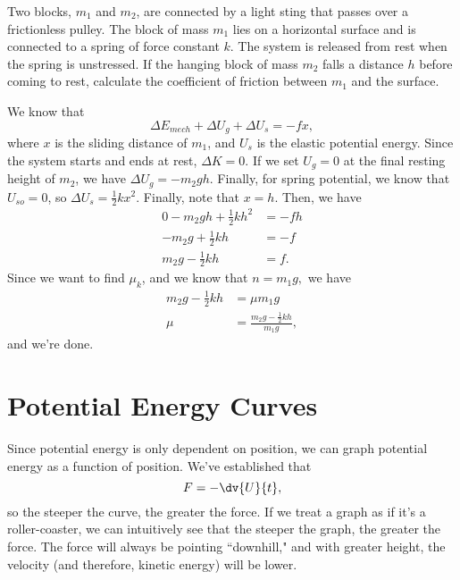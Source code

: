\documentclass[11pt]{article}
\begin{document}
\begin{example}
	Two blocks, $m_1$ and $m_2$, are connected by a light sting that passes over a frictionless pulley. The block of mass $m_1$ lies on a horizontal surface and is connected to a spring of force constant $k$. The system is released from rest when the spring is unstressed. If the hanging block of mass $m_2$ falls a distance $h$ before coming to rest, calculate the coefficient of friction between $m_1$ and the surface.
\end{example}
\begin{solution}
	We know that
	\[\Delta E_{mech} + \Delta U_g + \Delta U_s = -fx,\]
	where $x$ is the sliding distance of $m_1$, and $U_s$ is the elastic potential energy. Since the system starts and ends at rest, $\Delta K = 0$. If we set $U_g = 0$ at the final resting height of $m_2$, we have $\Delta U_g = -m_2gh$. Finally, for spring potential, we know that $U_{so} = 0$, so $\Delta U_s = \frac{1}{2}kx^2$. Finally, note that $x = h$. Then, we have
	\begin{align*}
		0 - m_2gh + \frac{1}{2}kh^2 &= -fh \\
		-m_2g + \frac{1}{2}kh &= -f \\
		m_2g - \frac{1}{2}kh &= f.
	\end{align*}
	Since we want to find $\mu_k$, and we know that $n = m_1g,$ we have
	\begin{align*}
		m_2g - \frac{1}{2}kh &= \mu m_1 g \\
		\mu &= \boxed{\frac{m_2g - \frac{1}{2}kh}{m_1g}},
	\end{align*}
	and we're done.
\end{solution}

\section{Potential Energy Curves}
Since potential energy is only dependent on position, we can graph potential energy as a function of position. We've established that
\[F = -\dv{U}{t},\]
so the steeper the curve, the greater the force. If we treat a graph as if it's a roller-coaster, we can intuitively see that the steeper the graph, the greater the force. The force will always be pointing ``downhill," and with greater height, the velocity (and therefore, kinetic energy) will be lower.
\end{document}
